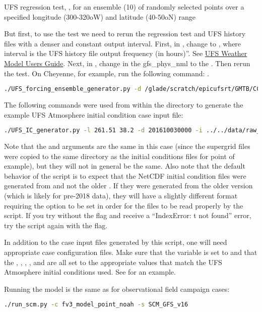 UFS regression test, , for an ensemble (10) of randomly selected points over a specified longitude (300-320oW) and latitude (40-50oN) range

But first, to use the  test we need to rerun the regression test and UFS history files with a denser and constant output interval. First, in , change  to , where interval is the UFS history file output frequency (in hours)”. See \href{https://ufs-weather-model.readthedocs.io/en/latest/InputsOutputs.html}{UFS Weather Model Users Guide}. Next, in , change  in the gfs_phys_nml to the . Then rerun the test. On Cheyenne, for example, run the following command: .
\begin{lstlisting}[language=bash]
./UFS_forcing_ensemble_generator.py -d /glade/scratch/epicufsrt/GMTB/CCPP-SCM/UFS_RTs/control_p8/ -sc --C_RES 96 -dt 720 -fhz 3 -n control_p8 -lonl 300 320 -latl 40 50 -nens 10
\end{lstlisting}



The following commands were used from within the  directory to generate the example UFS Atmosphere initial condition case input file:
\begin{lstlisting}[language=bash]
./UFS_IC_generator.py -l 261.51 38.2 -d 201610030000 -i ../../data/raw_case_input/FV3_C96_example_ICs -g ../../data/raw_case_input/FV3_C96_example_ICs -n fv3_model_point_noah -oc
\end{lstlisting}

Note that the  and  arguments are the same in this case (since the supergrid files were copied to the same directory as the initial conditions files for point of example), but they will not in general be the same. Also note that the default behavior of the script is to expect that the NetCDF initial condition files were generated from  and not the older . If they were generated from the older version (which is likely for pre-2018 data), they will have a slightly different format requiring the  option to be set in order for the files to be read properly by the script. If you try without the  flag and receive a ``IndexError: t not found'' error, try the script again with the flag.

In addition to the case input files generated by this script, one will need appropriate case configuration files. Make sure that the  variable is set to  and that the , , , , and  are all set to the appropriate values that match the UFS Atmosphere initial conditions used. See  for an example.

Running the model is the same as for observational field campaign cases:
\begin{lstlisting}[language=bash]
./run_scm.py -c fv3_model_point_noah -s SCM_GFS_v16
\end{lstlisting}
